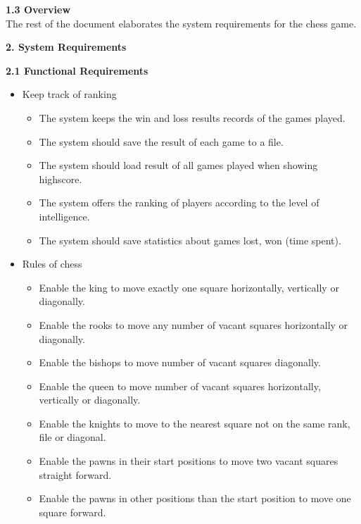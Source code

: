 \documentclass{article}
\begin{document}
\begin{flushleft}
\begin{itemize}
\end{itemize}

\vspace{5mm}
\textbf{1.3	Overview}\\
\vspace{1mm}
The rest of the document elaborates the system requirements for the chess game.\\
\vspace{10mm}

\begin{Large}\textbf{2.	System Requirements}\\
\end{Large}
\vspace{3mm}
\textbf{2.1	Functional Requirements}\\
\begin{itemize}
	\item Keep track of ranking
	\begin{itemize}
		\item The system keeps the win and loss results records of the games played.
		\item The system should save the result of each game to a file.
		\item The system should load result of all games played when showing highscore.
		\item The system offers the ranking of players according to the level of intelligence.
		\item The system should save statistics about games lost, won (time spent).
	\end{itemize}
	\item Rules of chess
	\begin{itemize}
		\item Enable the king to move exactly one square horizontally, vertically or diagonally.
		\item Enable the rooks to move any number of vacant squares horizontally or diagonally. 
		\item Enable the bishops to move number of vacant squares diagonally.
		\item Enable the queen to move number of vacant squares horizontally, vertically or diagonally.
		\item Enable the knights to move to the nearest square not on the same rank, file or diagonal. 
		\item Enable the pawns in their start positions to move two  vacant squares straight forward.
		\item Enable the pawns in other positions than the start position to move one square forward.

\end{itemize}
\end{itemize}
\end{flushleft}
\end{document}
